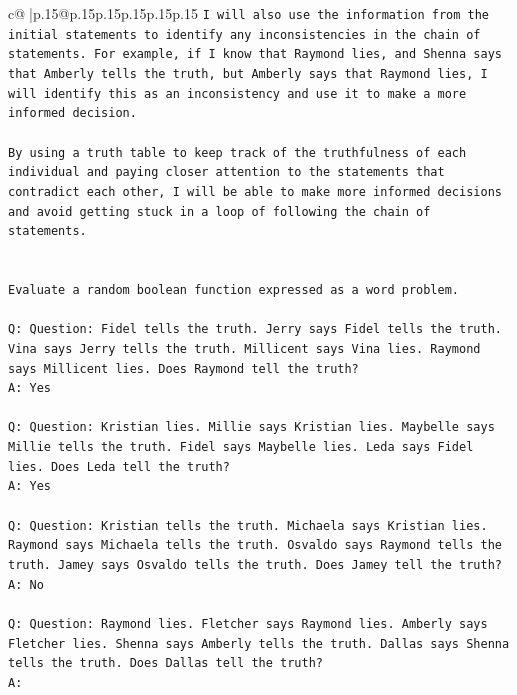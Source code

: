 \documentclass{article}
\begin{document}
{\begin{supertabular}{c@{$\;$}|p{.15\linewidth}@{}p{.15\linewidth}p{.15\linewidth}p{.15\linewidth}p{.15\linewidth}p{.15\linewidth}}
{{{\texttt{I will also use the information from the initial statements to identify any inconsistencies in the chain of statements. For example, if I know that Raymond lies, and Shenna says that Amberly tells the truth, but Amberly says that Raymond lies, I will identify this as an inconsistency and use it to make a more informed decision. } \\
\\ 
\texttt{By using a truth table to keep track of the truthfulness of each individual and paying closer attention to the statements that contradict each other, I will be able to make more informed decisions and avoid getting stuck in a loop of following the chain of statements.} \\
\\ 
\\ 
\texttt{Evaluate a random boolean function expressed as a word problem.} \\
\\ 
\texttt{Q: Question: Fidel tells the truth. Jerry says Fidel tells the truth. Vina says Jerry tells the truth. Millicent says Vina lies. Raymond says Millicent lies. Does Raymond tell the truth?} \\
\texttt{A: Yes} \\
\\ 
\texttt{Q: Question: Kristian lies. Millie says Kristian lies. Maybelle says Millie tells the truth. Fidel says Maybelle lies. Leda says Fidel lies. Does Leda tell the truth?} \\
\texttt{A: Yes} \\
\\ 
\texttt{Q: Question: Kristian tells the truth. Michaela says Kristian lies. Raymond says Michaela tells the truth. Osvaldo says Raymond tells the truth. Jamey says Osvaldo tells the truth. Does Jamey tell the truth?} \\
\texttt{A: No} \\
\\ 
\texttt{Q: Question: Raymond lies. Fletcher says Raymond lies. Amberly says Fletcher lies. Shenna says Amberly tells the truth. Dallas says Shenna tells the truth. Does Dallas tell the truth?} \\
\texttt{A:} \\
            }
        }
    }
     \\ \\


\end{supertabular}}
\end{document}
